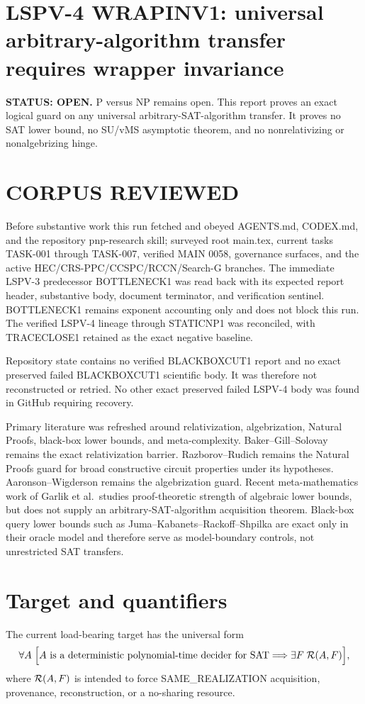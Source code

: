 \documentclass[11pt]{article}
\begin{document}
\section*{LSPV-4 WRAPINV1: universal arbitrary-algorithm transfer requires wrapper invariance}
\textbf{STATUS: OPEN.} P versus NP remains open. This report proves an exact logical guard on any universal arbitrary-SAT-algorithm transfer. It proves no SAT lower bound, no SU/vMS asymptotic theorem, and no nonrelativizing or nonalgebrizing hinge.

\section*{CORPUS REVIEWED}
Before substantive work this run fetched and obeyed AGENTS.md, CODEX.md, and the repository pnp-research skill; surveyed root main.tex, current tasks TASK-001 through TASK-007, verified MAIN 0058, governance surfaces, and the active HEC/CRS-PPC/CCSPC/RCCN/Search-G branches. The immediate LSPV-3 predecessor BOTTLENECK1 was read back with its expected report header, substantive body, document terminator, and verification sentinel. BOTTLENECK1 remains exponent accounting only and does not block this run. The verified LSPV-4 lineage through STATICNP1 was reconciled, with TRACECLOSE1 retained as the exact negative baseline.

Repository state contains no verified BLACKBOXCUT1 report and no exact preserved failed BLACKBOXCUT1 scientific body. It was therefore not reconstructed or retried. No other exact preserved failed LSPV-4 body was found in GitHub requiring recovery.

Primary literature was refreshed around relativization, algebrization, Natural Proofs, black-box lower bounds, and meta-complexity. Baker--Gill--Solovay remains the exact relativization barrier. Razborov--Rudich remains the Natural Proofs guard for broad constructive circuit properties under its hypotheses. Aaronson--Wigderson remains the algebrization guard. Recent meta-mathematics work of Garlik et al.\ studies proof-theoretic strength of algebraic lower bounds, but does not supply an arbitrary-SAT-algorithm acquisition theorem. Black-box query lower bounds such as Juma--Kabanets--Rackoff--Shpilka are exact only in their oracle model and therefore serve as model-boundary controls, not unrestricted SAT transfers.

\section*{Target and quantifiers}
The current load-bearing target has the universal form
\[
\forall A\;\Bigl[
A\text{ is a deterministic polynomial-time decider for SAT}
\Longrightarrow
\exists F\;{\cal R}(A,F)
\Bigr],
\]
where \({\cal R}(A,F)\) is intended to force SAME\_REALIZATION acquisition, provenance, reconstruction, or a no-sharing resource.
\end{document}
